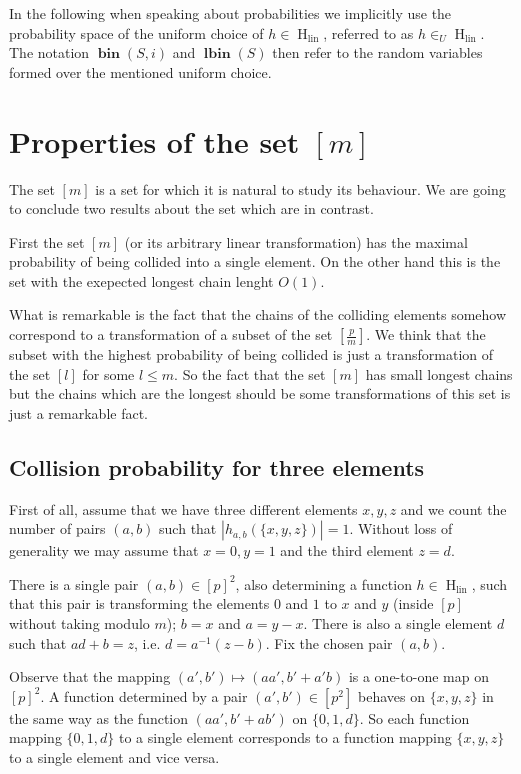 \documentclass{article}
\newcommand{\hlin}{\operatorname{H}_{\operatorname{lin}}}
\newcommand{\vbin}[2]{\operatorname{\mathbf{bin}}({#1}, {#2})}
\newcommand{\vlbin}[1]{\operatorname{\mathbf{lbin}}({#1})}
\newcommand{\inu}{\in_U}
\begin{document}
In the following when speaking about probabilities we implicitly use the probability space of the uniform choice of $h \in \hlin$, referred to as $h \inu \hlin$.
The notation $\vbin{S}{i}$ and $\vlbin{S}$ then refer to the random variables formed over the mentioned uniform choice.

\section{Properties of the set $[m]$}

The set $[m]$ is a set for which it is natural to study its behaviour.
We are going to conclude two results about the set which are in contrast.

First the set $[m]$ (or its arbitrary linear transformation) has the maximal probability of being collided into a single element.
On the other hand this is the set with the exepected longest chain lenght $O(1)$.

What is remarkable is the fact that the chains of the colliding elements somehow correspond to a transformation of a subset of the set $[\frac{p}{m}]$.
We think that the subset with the highest probability of being collided is just a transformation of the set $[l]$ for some $l \leq m$.
So the fact that the set $[m]$ has small longest chains but the chains which are the longest should be some transformations of this set is just a remarkable fact.

\subsection{Collision probability for three elements}

First of all, assume that we have three different elements $x, y, z$ and we count the number of pairs $(a, b)$ such that $|h_{a, b}(\{x, y, z\})| = 1$.
Without loss of generality we may assume that $x = 0, y = 1$ and the third element $z = d$.

There is a single pair $(a, b) \in [p] ^ 2$, also determining a function $h \in \hlin$, such that this pair is transforming the elements $0$ and $1$ to $x$ and $y$ (inside $[p]$ without taking modulo $m$); $b = x$ and $a = y - x$.
There is also a single element $d$ such that $ad + b = z$, i.e. $d = a ^ {-1}(z - b)$.
Fix the chosen pair $(a, b)$.

Observe that the mapping $(a', b') \mapsto (aa', b' + a'b)$ is a one-to-one map on $[p]^2$.
A function determined by a pair $(a', b') \in [p^2]$ behaves on $\{x, y, z\}$ in the same way as the function $(aa', b' + ab')$ on $\{0, 1, d\}$.
So each function mapping $\{0, 1, d\}$ to a single element corresponds to a function mapping $\{x, y, z\}$ to a single element and vice versa.
\end{document}

